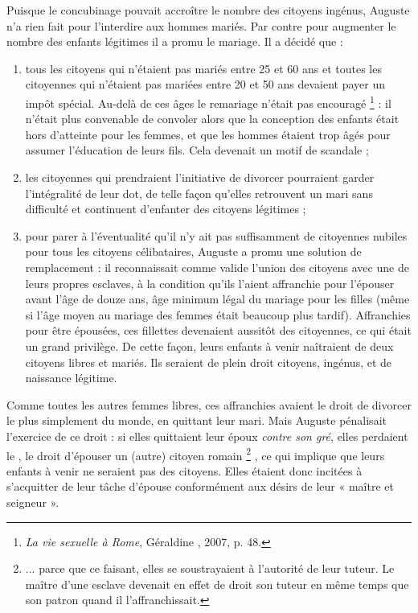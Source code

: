  Puisque le concubinage pouvait accroître le nombre des citoyens ingénus, Auguste n'a rien fait pour l'interdire aux hommes mariés. Par contre pour augmenter le nombre des enfants légitimes il a promu le mariage. Il a décidé que : 
\begin{enumerate}
\item tous les citoyens qui n'étaient pas mariés entre 25 et 60 ans et toutes les citoyennes qui n'étaient pas mariées entre 20 et 50 ans devaient payer un impôt spécial. Au-delà de ces âges le remariage n'était pas encouragé%
\footnote{\emph{La vie sexuelle à Rome}, Géraldine , 2007, p. 48.}
: il n'était plus convenable de convoler alors que la conception des enfants était hors d'atteinte pour les femmes, et que les hommes étaient trop âgés pour assumer l'éducation de leurs fils. Cela devenait un motif de scandale ;
\item les citoyennes qui prendraient l'initiative de divorcer pourraient garder l'intégralité de leur dot, de telle façon qu'elles retrouvent un mari sans difficulté et continuent d'enfanter des citoyens légitimes ;
\item pour parer à l'éventualité qu'il n'y ait pas suffisamment de citoyennes nubiles pour tous les citoyens célibataires, Auguste a promu une solution de remplacement : il reconnaissait comme valide l'union des citoyens avec une de leurs propres esclaves, à la condition qu'ils l'aient affranchie pour l'épouser avant l'âge de douze ans, âge minimum légal du mariage pour les filles (même si l'âge moyen au mariage des femmes était beaucoup plus tardif). Affranchies pour être épousées, ces fillettes devenaient aussitôt des citoyennes, ce qui était un grand privilège. De cette façon, leurs enfants à venir naîtraient de deux citoyens libres et mariés. Ils seraient de plein droit citoyens, ingénus, et de naissance légitime. 
\end{enumerate}

 Comme toutes les autres femmes libres, ces affranchies avaient le droit de divorcer le plus simplement du monde, en quittant leur mari. Mais Auguste pénalisait l'exercice de ce droit : si elles quittaient leur époux \emph{contre son gré}, elles perdaient le , le droit d'épouser un (autre) citoyen romain%
\footnote{... parce que ce faisant, elles se soustrayaient à l'autorité de leur tuteur. Le maître d'une esclave devenait en effet de droit son tuteur en même temps que son patron quand il l'affranchissait.}%
, ce qui implique que leurs enfants à venir ne seraient pas des citoyens. Elles étaient donc incitées à s'acquitter de leur tâche d'épouse conformément aux désirs de leur « maître et seigneur ».

